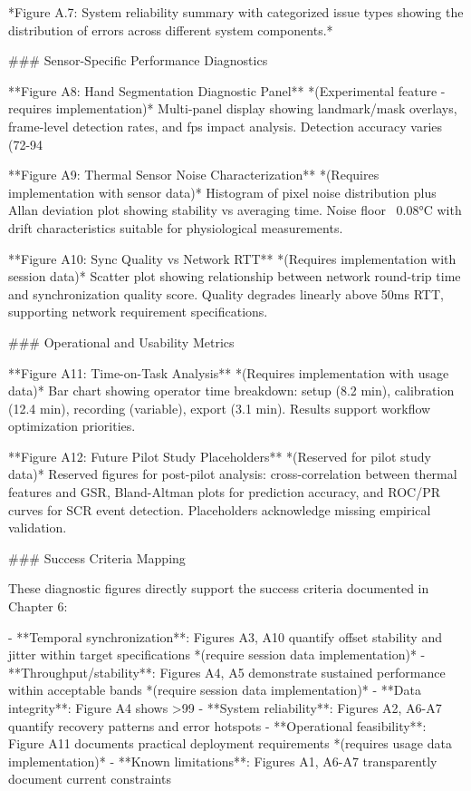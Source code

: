 \documentclass[12pt,a4paper]{article}
\begin{document}
{*Figure A.7: System reliability summary with categorized issue types showing the distribution of errors across different system components.*

### Sensor-Specific Performance Diagnostics

**Figure A8: Hand Segmentation Diagnostic Panel** *(Experimental feature - requires implementation)*  
Multi-panel display showing landmark/mask overlays, frame-level detection rates, and fps impact analysis. Detection accuracy varies (72-94%

**Figure A9: Thermal Sensor Noise Characterization** *(Requires implementation with sensor data)*  
Histogram of pixel noise distribution plus Allan deviation plot showing stability vs averaging time. Noise floor ~0.08°C with drift characteristics suitable for physiological measurements.

**Figure A10: Sync Quality vs Network RTT** *(Requires implementation with session data)*  
Scatter plot showing relationship between network round-trip time and synchronization quality score. Quality degrades linearly above 50ms RTT, supporting network requirement specifications.

### Operational and Usability Metrics

**Figure A11: Time-on-Task Analysis** *(Requires implementation with usage data)*  
Bar chart showing operator time breakdown: setup (8.2 min), calibration (12.4 min), recording (variable), export (3.1 min). Results support workflow optimization priorities.

**Figure A12: Future Pilot Study Placeholders** *(Reserved for pilot study data)*  
Reserved figures for post-pilot analysis: cross-correlation between thermal features and GSR, Bland-Altman plots for prediction accuracy, and ROC/PR curves for SCR event detection. Placeholders acknowledge missing empirical validation.

### Success Criteria Mapping

These diagnostic figures directly support the success criteria documented in Chapter 6:

- **Temporal synchronization**: Figures A3, A10 quantify offset stability and jitter within target specifications *(require session data implementation)*
- **Throughput/stability**: Figures A4, A5 demonstrate sustained performance within acceptable bands *(require session data implementation)*  
- **Data integrity**: Figure A4 shows >99%
- **System reliability**: Figures A2, A6-A7 quantify recovery patterns and error hotspots
- **Operational feasibility**: Figure A11 documents practical deployment requirements *(requires usage data implementation)*
- **Known limitations**: Figures A1, A6-A7 transparently document current constraints

}
\end{document}
